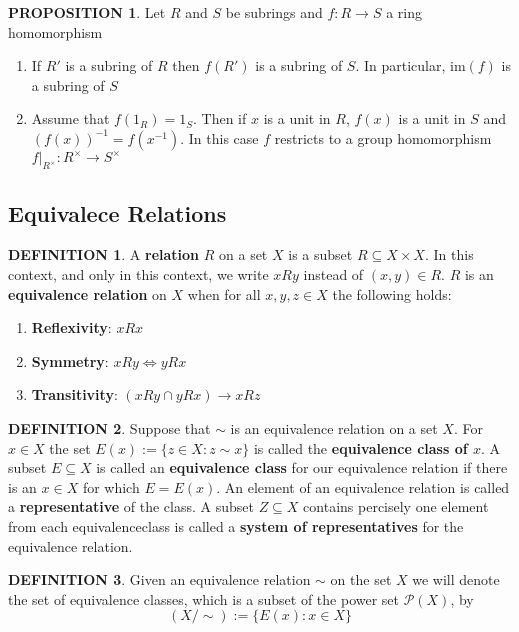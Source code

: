 \documentclass[12pt]{article}
\theoremstyle{definition}
\newtheorem{definition}{DEFINITION}[subsection]
\newtheorem{prop}{PROPOSITION}[subsection]
\begin{document}
\begin{prop}
    Let $R$ and $S$ be subrings and $f:R\rightarrow S$ a ring homomorphism
    \begin{enumerate}
        \item If $R'$ is a subring of $R$ then $f(R')$ is a subring of $S$. In particular, $\text{im}(f)$ is a subring of $S$
        \item Assume that $f(1_R) = 1_S$. Then if $x$ is a unit in  $R$, $f(x)$ is a unit in $S$ and $(f(x))^{-1} = f(x^{-1})$. In this case $f$ restricts to a group homomorphism $f|_{R^\times}:R^\times \rightarrow S^\times$
    \end{enumerate}
\end{prop}

\subsection{Equivalece Relations}
\begin{definition}
    A \textbf{relation} $R$ on a set $X$ is a subset $R \subseteq X \times X$. In this context, and only in this context, we write $xRy$ instead of $(x,y) \in R$. $R$ is an \textbf{equivalence relation} on $X$ when for all $x,y,z \in X$ the following holds:
    \begin{enumerate}
        \item \textbf{Reflexivity}: $xRx$
        \item \textbf{Symmetry}: $xRy \Leftrightarrow yRx$
        \item \textbf{Transitivity}: $(xRy \cap yRx) \rightarrow xRz$
    \end{enumerate}
\end{definition}

\begin{definition}
    Suppose that $\sim$ is an equivalence relation on a set $X$. For $x \in X$ the set $E(x) := \{z \in X: z \sim x\}$ is called the \textbf{equivalence class of $x$}. A subset $E \subseteq X$ is called an \textbf{equivalence class} for our equivalence relation if there is an $x \in X$ for which $E = E(x)$. An element of an equivalence relation is called a \textbf{representative} of the class. A subset $Z \subseteq X$ contains percisely one element from each equivalenceclass is called a \textbf{system of representatives} for the equivalence relation.
\end{definition}

\begin{definition}
    Given an equivalence relation $\sim$ on the set $X$ we will denote the set of equivalence classes, which is a subset of the power set $\mathcal{P}(X)$, by $$(X/\sim) := \{E(x):x\in X\}$$
\end{definition}
\end{document}
